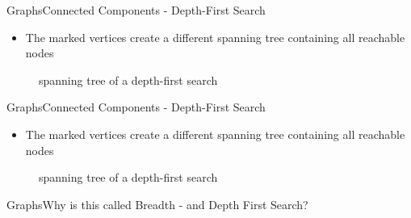 

\begin{frame}{Graphs}{Connected Components - Depth-First Search}
  \begin{itemize}
    \item
      The marked vertices create a different spanning tree containing all
      reachable nodes
  \end{itemize}
  \begin{figure}
    \begin{adjustbox}{width=0.95\linewidth}
      
    \end{adjustbox}
    \caption{spanning tree of a depth-first search}
  \end{figure}
\end{frame}


\begin{frame}{Graphs}{Connected Components - Depth-First Search}
  \begin{itemize}
    \item
      The marked vertices create a different spanning tree containing all
      reachable nodes
  \end{itemize}
  \begin{figure}
    \begin{adjustbox}{width=0.95\linewidth}
      
    \end{adjustbox}
    \caption{spanning tree of a depth-first search}
    \label{fig:graph:depth_first_search_spanning_tree}
  \end{figure}
\end{frame}

\begin{frame}{Graphs}{Why is this called Breadth - and Depth First Search?}
 
\end{frame}

